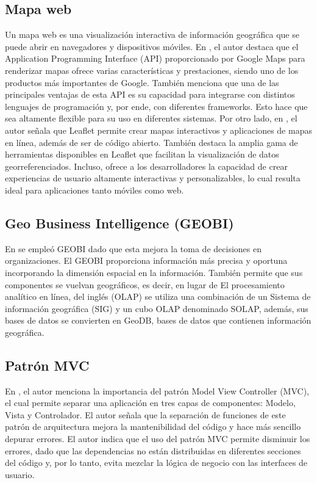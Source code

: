 \subsection{Mapa web}
Un mapa web es una visualización interactiva de información geográfica que se puede abrir en navegadores y dispositivos móviles.
En \cite{botto-tobarAppliedTechnologiesSecond2021}, el autor destaca que el Application Programming Interface (API) proporcionado por Google Maps para renderizar
mapas ofrece varias características y prestaciones, siendo uno de los productos más importantes de Google. También menciona que
una de las principales ventajas de esta API es su capacidad para integrarse con distintos lenguajes de programación y, por ende,
con diferentes frameworks. Esto hace que sea altamente flexible para su uso en diferentes sistemas. Por otro lado, en
\cite{cantilloAplicativoMovilPara}, el autor señala que Leaflet permite crear mapas interactivos y aplicaciones de
mapas en línea, además de ser de código abierto. También destaca la amplia gama de herramientas disponibles en Leaflet que
facilitan la visualización de datos georreferenciados. Incluso, ofrece a los desarrolladores la capacidad de crear experiencias
de usuario altamente interactivas y personalizables, lo cual resulta ideal para aplicaciones tanto móviles como web.

\subsection{Geo Business Intelligence (GEOBI)}
En \cite{herreraGeoBIBigVGI2015} se empleó GEOBI dado que esta mejora la toma de decisiones en organizaciones. El
GEOBI proporciona información más precisa y oportuna incorporando la dimensión espacial en la información. También
permite que sus componentes se vuelvan geográficos, es decir, en lugar de El procesamiento analítico en línea, del inglés
(OLAP) se utiliza una combinación de un Sistema de información geográfica (SIG) y un cubo OLAP denominado SOLAP, además,
sus bases de datos se convierten en GeoDB, bases de datos que contienen información geográfica.

\subsection{Patrón MVC}
En \cite{lesanoperezAplicativoMovilGeoubicacion2022}, el autor menciona la importancia del patrón Model View Controller
(MVC), el cual permite separar una aplicación en tres capas de componentes: Modelo, Vista y Controlador. El autor señala que
la separación de funciones de este patrón de arquitectura mejora la mantenibilidad del código y hace más sencillo depurar
errores. El autor indica que el uso del patrón MVC permite disminuir los errores, dado que las dependencias no están
distribuidas en diferentes secciones del código y, por lo tanto, evita mezclar la lógica de negocio con las interfaces
de usuario.

